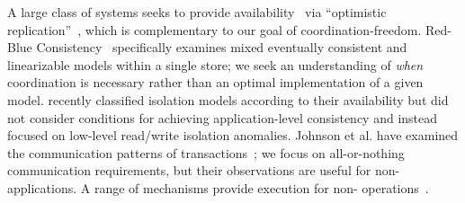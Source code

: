  A large class of systems
seeks to provide availability~\cite{gilbert-cap} via ``optimistic
replication''~\cite{optimistic}, which is complementary to our goal of
coordination-freedom. Red-Blue Consistency~\cite{redblue} specifically
examines mixed eventually consistent and linearizable models within a
single store; we seek an understanding of \textit{when} coordination
is necessary rather than an optimal implementation of a given
model. \cite{hat-vldb} recently classified isolation models according
to their availability but did not consider conditions for achieving
application-level consistency and instead focused on low-level
read/write isolation anomalies.  Johnson et al. have examined the
communication patterns of transactions~\cite{shore-communication}; we
focus on all-or-nothing communication requirements, but their
observations are useful for non-\iconfluent applications. A range of
mechanisms provide execution for non-\cfree
operations~\cite{silo,spanner,mdcc,bernstein-book,gray-book,hstore,megastore}.

